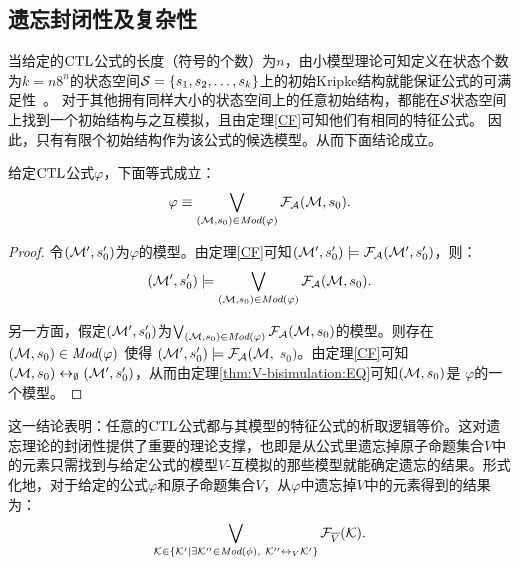 \subsection{遗忘封闭性及复杂性}\label{chapter06:sec:close}
当给定的$\textrm{CTL}$公式的长度（符号的个数）为$n$，由小模型理论可知定义在状态个数为$k=n8^n$的状态空间${\cal S}=\{s_1,s_2,\dots, s_k\}$上的初始Kripke结构就能保证公式的可满足性~\cite{DBLP:journals/jcss/EmersonH85}。
对于其他拥有同样大小的状态空间上的任意初始结构，都能在${\cal S}$状态空间上找到一个初始结构与之互模拟，且由定理\ref{CF}可知他们有相同的特征公式。
因此，只有有限个初始结构作为该公式的候选模型。从而下面结论成立。

\begin{lemma}\label{lem:models:formula}
	给定$\textrm{CTL}$公式$\varphi$，下面等式成立：
	\begin{equation*}
		\varphi\equiv \bigvee_{({\cal M}, s_0)\in\textit{Mod}(\varphi)}{\cal F}_{\cal A}({\cal M}, s_0).
	\end{equation*}
\end{lemma}
\begin{proof}
	令$({\cal M}', s_0')$为$\varphi$的模型。由定理\ref{CF}可知$({\cal M}', s_0') \models {\cal F}_{{\cal A}}({\cal M}', s_0')$，则：
	$$({\cal M}', s_0') \models \bigvee_{({\cal M}, s_0)\in \textit{Mod}(\varphi)} {\cal F}_{{\cal A}}({\cal M}, s_0).$$
	
	另一方面，假定$({\cal M}', s_0')$为$\bigvee_{({\cal M}, s_0)\in \textit{Mod}(\varphi)} {\cal F}_{{\cal A}}({\cal M}, s_0)$的模型。则存在$({\cal M}, s_0)\in \textit{Mod}(\varphi)$ 使得 $({\cal M}', s_0') \models {\cal F}_{{\cal A}}({\cal M},$ $s_0)$。由定理\ref{CF}可知$({\cal M}, s_0) \leftrightarrow_{\emptyset} ({\cal M}', s_0')$，从而由定理\ref{thm:V-bisimulation:EQ}可知$({\cal M}, s_0)$是 $\varphi$的一个模型。
\end{proof}

这一结论表明：任意的$\textrm{CTL}$公式都与其模型的特征公式的析取逻辑等价。这对遗忘理论的封闭性提供了重要的理论支撑，也即是从公式里遗忘掉原子命题集合$V$中的元素只需找到与给定公式的模型$V$-互模拟的那些模型就能确定遗忘的结果。形式化地，对于给定的公式$\varphi$和原子命题集合$V$，从$\varphi$中遗忘掉$V$中的元素得到的结果为：
\begin{equation*}
	\bigvee_{{\cal K}\in  \{{\cal K}'\mid \exists {\cal K}''\in\textit{Mod}(\phi),\ {\cal K}''\leftrightarrow_V{\cal K}'\}} {\cal F}_{\overline V}({\cal K}).
\end{equation*}



